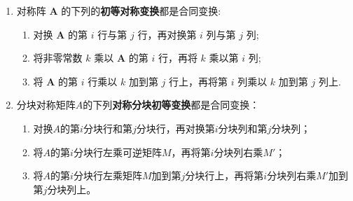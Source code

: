 \documentclass[../../main.tex]{subfiles}
\begin{document}
\begin{lemma}[初等合同变换]\label{lemma:初等合同变换}
\begin{enumerate}
\item 对称阵 $\boldsymbol{A}$ 的下列的\textbf{初等对称变换}都是合同变换:
\begin{enumerate}[(1)]
\item 对换 $\boldsymbol{A}$ 的第 $i$ 行与第 $j$ 行，再对换第 $i$ 列与第 $j$ 列;
\item 将非零常数 $k$ 乘以 $\boldsymbol{A}$ 的第 $i$ 行，再将 $k$ 乘以第 $i$ 列;
\item 将 $\boldsymbol{A}$ 的第 $i$ 行乘以 $k$ 加到第 $j$ 行上，再将第 $i$ 列乘以 $k$ 加到第 $j$ 列上.
\end{enumerate}

\item 分块对称矩阵\(A\)的下列\textbf{对称分块初等变换}都是合同变换：
\begin{enumerate}[(1)]
\item 对换\(A\)的第\(i\)分块行和第\(j\)分块行，再对换第\(i\)分块列和第\(j\)分块列；
\item 将\(A\)的第\(i\)分块行左乘可逆矩阵\(M\)，再将第\(i\)分块列右乘\(M'\)；
\item 将\(A\)的第\(i\)分块行左乘矩阵\(M\)加到第\(j\)分块行上，再将第\(i\)分块列右乘\(M'\)加到第\(j\)分块列上。
\end{enumerate}
\end{enumerate}
\end{lemma}
\end{document}
